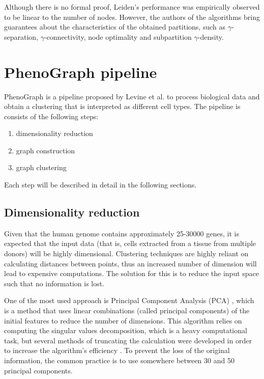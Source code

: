 Although there is no formal proof, Leiden's performance was empirically observed to be linear to the number of nodes. However, the authors of the algorithms bring guarantees about the characteristics of the obtained partitions, such as $\gamma$-separation, $\gamma$-connectivity, node optimality and subpartition $\gamma$-density.

\section{PhenoGraph pipeline}
    PhenoGraph \cite{Levine2015} is a pipeline proposed by Levine et al. to process biological data and obtain a clustering that is interpreted as different cell types. The pipeline is consists of the following steps:
    \begin{enumerate}
        \item dimensionality reduction
        \item graph construction
        \item graph clustering
    \end{enumerate}

    Each step will be described in detail in the following sections.

    \subsection{Dimensionality reduction}
    Given that the human genome contains approximately 25-30000 genes, it is expected that the input data (that is, cells extracted from a tissue from multiple donors) will be highly dimensional. Clustering techniques are highly reliant on calculating distances between points, thus an increased number of dimension will lead to expensive computations. The solution for this is to reduce the input space such that no information is lost.
    
    One of the most used approach is Principal Component Analysis (PCA) \cite{WOLD198737}, which is a method that uses linear combinations (called principal components) of the initial features to reduce the number of dimensions. This algorithm relies on computing the singular values decomposition, which is a heavy computational task, but several methods of truncating the calculation were developed in order to increase the algorithm's efficiency \cite{Baglama2016IRLBAFP}. To prevent the loss of the original information, the common practice is to use somewhere between 30 and 50 principal components.

